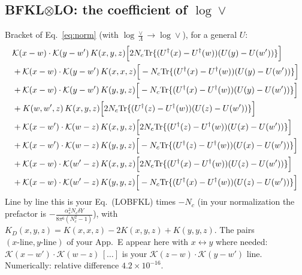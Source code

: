 \documentclass[10pt]{article}
\numberwithin{equation}{section}
\begin{document}
\subsection{BFKL\texorpdfstring{$\otimes$}{x}LO: the coefficient of \texorpdfstring{$\log\vee$}{log vee}}
Bracket of Eq.~\eqref{eq:norm} (with $\log\frac\vee\Lambda\to\log\vee$), for a general $U$:
\begin{align}
&\mathcal K(x-w)\cdot\mathcal K(y-w')\,K(x,y,z)\Big[2 N_c{\rm Tr}\{(U^\dagger(x)-U^\dagger(w))(U(y)-U(w'))\}\Big]\notag\\
&+\mathcal K(x-w)\cdot\mathcal K(y-w')\,K(x,x,z)\Big[-N_c{\rm Tr}\{(U^\dagger(x)-U^\dagger(w))(U(y)-U(w'))\}\Big]\notag\\
&+\mathcal K(x-w)\cdot\mathcal K(y-w')\,K(y,y,z)\Big[-N_c{\rm Tr}\{(U^\dagger(x)-U^\dagger(w))(U(y)-U(w'))\}\Big]\notag\\
&+K(w,w',z)\,K(x,y,z)\Big[2 N_c{\rm Tr}\{(U^\dagger(z)-U^\dagger(w))(U(z)-U(w'))\}\Big]\notag\\
&+\mathcal K(x-w')\cdot\mathcal K(w-z)\,K(x,y,z)\Big[2 N_c{\rm Tr}\{(U^\dagger(z)-U^\dagger(w))(U(x)-U(w'))\}\Big]\notag\\
&+\mathcal K(x-w')\cdot\mathcal K(w-z)\,K(y,y,z)\Big[-N_c{\rm Tr}\{(U^\dagger(z)-U^\dagger(w))(U(x)-U(w'))\}\Big]\notag\\
&+\mathcal K(x-w)\cdot\mathcal K(w'-z)\,K(x,y,z)\Big[2 N_c{\rm Tr}\{(U^\dagger(x)-U^\dagger(w))(U(z)-U(w'))\}\Big]\notag\\
&+\mathcal K(x-w)\cdot\mathcal K(w'-z)\,K(y,y,z)\Big[-N_c{\rm Tr}\{(U^\dagger(x)-U^\dagger(w))(U(z)-U(w'))\}\Big]
\label{eq:B}
\end{align}
Line by line this is your Eq.~(LOBFKL) times $-N_c$ (in your normalization the prefactor is $-\frac{\alpha_s^2N_c\delta Y}{8\pi^6(N_c^2-1)}$), with $K_D(x,y,z)=K(x,x,z)-2K(x,y,z)+K(y,y,z)$. The pairs $(x\text{-line},y\text{-line})$ of your App.~E appear here with $x\leftrightarrow y$ where needed: $\mathcal K(x-w')\cdot\mathcal K(w-z)\,[\dots]$ is your $\mathcal K(z-w)\cdot\mathcal K(y-w')$ line. Numerically: relative difference $4.2\times10^{-16}$.
\end{document}
